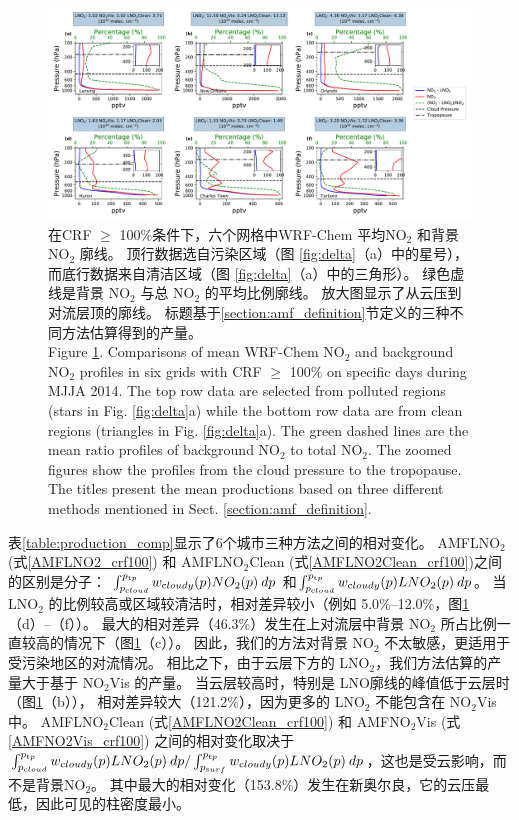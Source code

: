 \begin{figure}[htbp]
\includegraphics[width=18cm]{./figures/bkgd_comp.pdf}
\caption{在CRF $\geq$ 100\%条件下，六个网格中WRF-Chem 平均NO$_\textrm{2}$ 和背景 NO$_\textrm{2}$ 廓线。
顶行数据选自污染区域（图 \ref{fig:delta}（a）中的星号），而底行数据来自清洁区域（图 \ref{fig:delta}（a）中的三角形）。
绿色虚线是背景 NO$_\textrm{2}$ 与总 NO$_\textrm{2}$ 的平均比例廓线。
放大图显示了从云压到对流层顶的廓线。
标题基于\ref{section:amf_definition}节定义的三种不同方法估算得到的产量。\\
Figure \ref{fig:bkgd_comp}. Comparisons of mean WRF-Chem NO$_\textrm{2}$ and background NO$_\textrm{2}$ profiles in six grids with CRF $\geq$ 100\% on specific days during MJJA 2014.
The top row data are selected from polluted regions (stars in Fig. \ref{fig:delta}a) while the bottom row data are from clean regions (triangles in Fig. \ref{fig:delta}a).
The green dashed lines are the mean ratio profiles of background NO$_\textrm{2}$ to total NO$_\textrm{2}$.
The zoomed figures show the profiles from the cloud pressure to the tropopause.
The titles present the mean productions based on three different methods mentioned in Sect. \ref{section:amf_definition}.}
\label{fig:bkgd_comp}
\end{figure}


表\ref{table:production_comp}显示了6个城市三种方法之间的相对变化。
AMFLNO$_2$ (式\ref{AMFLNO2_crf100}) 和 AMFLNO$_2$Clean (式\ref{AMFLNO2Clean_crf100})之间的区别是分子：
$\int_{p_{\textrm cloud}}^{p_{\textrm tp}} w_{\textrm cloudy}(p) NO_2(p) \: dp$
和$\int_{p_{\textrm cloud}}^{p_{\textrm tp}} w_{\textrm cloudy}(p) LNO_2(p) \: dp$。
当 LNO$_2$ 的比例较高或区域较清洁时，相对差异较小（例如 5.0\%--12.0\%，图\ref{fig:bkgd_comp}（d）--（f））。
最大的相对差异（46.3\%）发生在上对流层中背景 NO$_2$ 所占比例一直较高的情况下（图\ref{fig:bkgd_comp}（c））。
因此，我们的方法对背景 NO$_2$ 不太敏感，更适用于受污染地区的对流情况。
相比之下，由于云层下方的 LNO$_2$，我们方法估算的产量大于基于 NO$_2$Vis 的产量。
当云层较高时，特别是 LNO廓线的峰值低于云层时（图\ref{fig:bkgd_comp}（b）），
相对差异较大（121.2\%），因为更多的 LNO$_2$ 不能包含在 NO$_2$Vis 中。
AMFLNO$_2$Clean (式\ref{AMFLNO2Clean_crf100}) 和 AMFNO$_2$Vis (式\ref{AMFNO2Vis_crf100}) 之间的相对变化取决于
$\int_{p_{\textrm cloud}}^{p_{\textrm tp}} w_{\textrm cloudy}(p) LNO_2(p) \: dp / \int_{p_{\textrm surf}}^{p_{\textrm tp}} w_{\textrm cloudy}(p) LNO_2(p) \: dp$，这也是受云影响，而不是背景NO$_2$。
其中最大的相对变化（153.8\%）发生在新奥尔良，它的云压最低，因此可见的柱密度最小。

